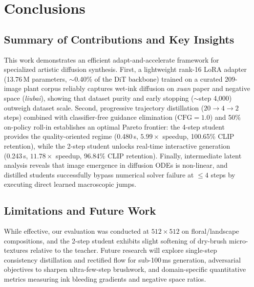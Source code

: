 \documentclass{article}
\begin{document}
\section{Conclusions}

\subsection{Summary of Contributions and Key Insights}
This work demonstrates an efficient adapt-and-accelerate framework for specialized artistic diffusion synthesis. First, a lightweight rank-16 LoRA adapter (13.76\,M parameters, $\sim$0.40\% of the DiT backbone) trained on a curated 209-image plant corpus reliably captures wet-ink diffusion on \textit{xuan} paper and negative space (\textit{liubai}), showing that dataset purity and early stopping ($\sim$step 4,000) outweigh dataset scale. Second, progressive trajectory distillation ($20 \to 4 \to 2$ steps) combined with classifier-free guidance elimination ($\text{CFG}=1.0$) and 50\% on-policy roll-in establishes an optimal Pareto frontier: the 4-step student provides the quality-oriented regime (0.480\,s, $5.99\times$ speedup, 100.65\% CLIP retention), while the 2-step student unlocks real-time interactive generation (0.243\,s, $11.78\times$ speedup, 96.84\% CLIP retention). Finally, intermediate latent analysis reveals that image emergence in diffusion ODEs is non-linear, and distilled students successfully bypass numerical solver failure at $\le 4$ steps by executing direct learned macroscopic jumps.

\subsection{Limitations and Future Work}
While effective, our evaluation was conducted at $512 \times 512$ on floral/landscape compositions, and the 2-step student exhibits slight softening of dry-brush micro-textures relative to the teacher. Future research will explore single-step consistency distillation and rectified flow for sub-100\,ms generation, adversarial objectives to sharpen ultra-few-step brushwork, and domain-specific quantitative metrics measuring ink bleeding gradients and negative space ratios.
\end{document}
